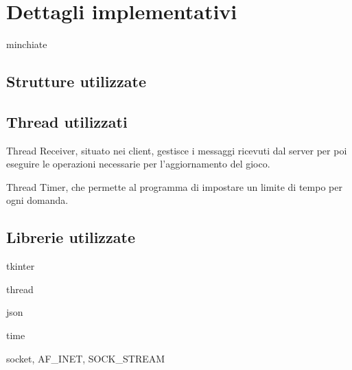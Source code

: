 \documentclass[a4paper,12pt]{report}
\begin{document}
{		\chapter{Dettagli implementativi}
			minchiate
			\section{Strutture utilizzate}
				\begin{description}[font=$\bullet$~\normalfont\scshape\color{red!90!black}]
					\item 
											
					\item 
											
					\item
				\end{description}
				
			\section{Thread utilizzati}
				\begin{description}[font=$\bullet$~\normalfont\scshape\color{red!90!black}]
					\item Thread Receiver, situato nei client, gestisce i messaggi ricevuti dal server per poi eseguire le operazioni necessarie per l'aggiornamento del gioco.
								
					\item Thread Timer, che permette al programma di impostare un limite di tempo per ogni domanda.
								
					\item
				\end{description}
				
			\section{Librerie utilizzate}	
				\begin{description}[font=$\bullet$~\normalfont\scshape\color{red!90!black}]
					\item tkinter
					\item thread
					\item json
					\item time
					\item socket, AF\_INET, SOCK\_STREAM
				\end{description}
	}
\end{document}
